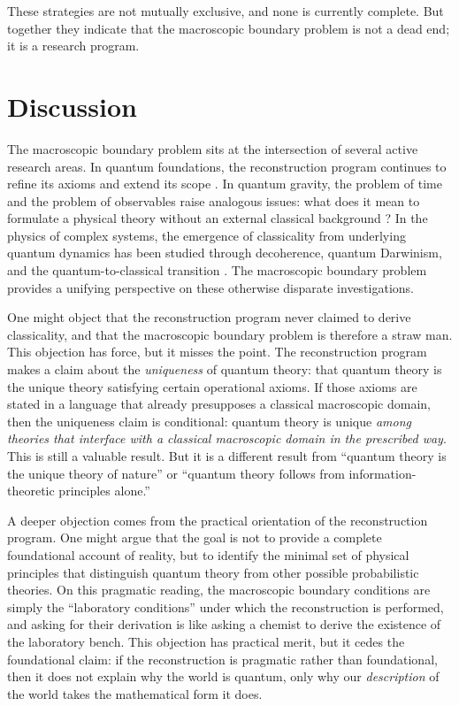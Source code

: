 \documentclass[pdflatex,sn-mathphys-num]{sn-jnl}%
\begin{document}
These strategies are not mutually exclusive, and none is currently complete. But together they indicate that the macroscopic boundary problem is not a dead end; it is a research program.

\section{Discussion}\label{sec5}

The macroscopic boundary problem sits at the intersection of several active research areas. In quantum foundations, the reconstruction program continues to refine its axioms and extend its scope \cite{DAriano2017,Barnum2014}. In quantum gravity, the problem of time and the problem of observables raise analogous issues: what does it mean to formulate a physical theory without an external classical background \cite{Rovelli2004}? In the physics of complex systems, the emergence of classicality from underlying quantum dynamics has been studied through decoherence, quantum Darwinism, and the quantum-to-classical transition \cite{Zurek2009,Brandao2015}. The macroscopic boundary problem provides a unifying perspective on these otherwise disparate investigations.

One might object that the reconstruction program never claimed to derive classicality, and that the macroscopic boundary problem is therefore a straw man. This objection has force, but it misses the point. The reconstruction program makes a claim about the \emph{uniqueness} of quantum theory: that quantum theory is the unique theory satisfying certain operational axioms. If those axioms are stated in a language that already presupposes a classical macroscopic domain, then the uniqueness claim is conditional: quantum theory is unique \emph{among theories that interface with a classical macroscopic domain in the prescribed way}. This is still a valuable result. But it is a different result from ``quantum theory is the unique theory of nature'' or ``quantum theory follows from information-theoretic principles alone.''

A deeper objection comes from the practical orientation of the reconstruction program. One might argue that the goal is not to provide a complete foundational account of reality, but to identify the minimal set of physical principles that distinguish quantum theory from other possible probabilistic theories. On this pragmatic reading, the macroscopic boundary conditions are simply the ``laboratory conditions'' under which the reconstruction is performed, and asking for their derivation is like asking a chemist to derive the existence of the laboratory bench. This objection has practical merit, but it cedes the foundational claim: if the reconstruction is pragmatic rather than foundational, then it does not explain why the world is quantum, only why our \emph{description} of the world takes the mathematical form it does.
\end{document}
